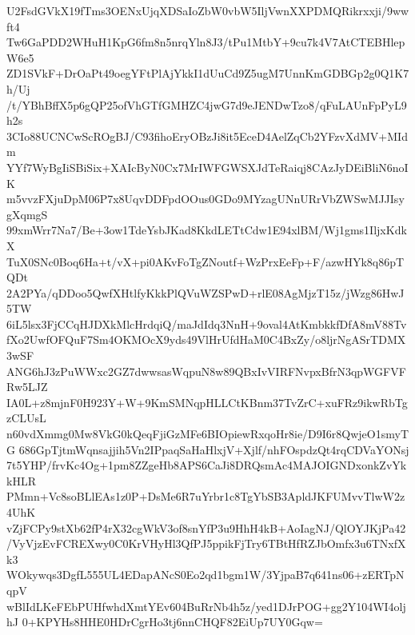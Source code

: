 U2FsdGVkX19fTms3OENxUjqXDSaIoZbW0vbW5IljVwnXXPDMQRikrxxji/9wwft4
Tw6GaPDD2WHuH1KpG6fm8n5nrqYln8J3/tPu1MtbY+9cu7k4V7AtCTEBHlepW6e5
ZD1SVkF+DrOaPt49oegYFtPlAjYkkI1dUuCd9Z5ugM7UnnKmGDBGp2g0Q1K7h/Uj
/t/YBhBffX5p6gQP25ofVhGTfGMHZC4jwG7d9eJENDwTzo8/qFuLAUnFpPyL9h2s
3CIo88UCNCwScROgBJ/C93fihoEryOBzJi8it5EceD4AelZqCb2YFzvXdMV+MIdm
YYf7WyBgIiSBiSix+XAIcByN0Cx7MrIWFGWSXJdTeRaiqj8CAzJyDEiBliN6noIK
m5vvzFXjuDpM06P7x8UqvDDFpdOOus0GDo9MYzagUNnURrVbZWSwMJJIsygXqmgS
99xmWrr7Na7/Be+3ow1TdeYsbJKad8KkdLETtCdw1E94xlBM/Wj1gms1IljxKdkX
TuX0SNc0Boq6Ha+t/vX+pi0AKvFoTgZNoutf+WzPrxEeFp+F/azwHYk8q86pTQDt
2A2PYa/qDDoo5QwfXHtlfyKkkPlQVuWZSPwD+rlE08AgMjzT15z/jWzg86HwJ5TW
6iL5lsx3FjCCqHJDXkMlcHrdqiQ/maJdIdq3NnH+9oval4AtKmbkkfDfA8mV88Tv
fXo2UwfOFQuF7Sm4OKMOcX9yds49VlHrUfdHaM0C4BxZy/o8ljrNgASrTDMX3wSF
ANG6hJ3zPuWWxc2GZ7dwwsasWqpuN8w89QBxIvVIRFNvpxBfrN3qpWGFVFRw5LJZ
IA0L+z8mjnF0H923Y+W+9KmSMNqpHLLCtKBnm37TvZrC+xuFRz9ikwRbTgzCLUsL
n60vdXmmg0Mw8VkG0kQeqFjiGzMFe6BIOpiewRxqoHr8ie/D9I6r8QwjeO1smyTG
686GpTjtmWqnsajjih5Vn2IPpaqSaHaHlxjV+Xjlf/nhFOspdzQt4rqCDVaYONsj
7t5YHP/frvKc4Og+1pm8ZZgeHb8APS6CaJi8DRQsmAc4MAJOIGNDxonkZvYkkHLR
PMmn+Vc8soBLlEAs1z0P+DsMe6R7uYrbr1c8TgYbSB3ApldJKFUMvvTlwW2z4UhK
vZjFCPy9stXb62fP4rX32cgWkV3of8snYfP3u9HhH4kB+AoIagNJ/QlOYJKjPa42
/VyVjzEvFCREXwy0C0KrVHyHl3QfPJ5ppikFjTry6TBtHfRZJbOmfx3u6TNxfXk3
WOkywqs3DgfL555UL4EDapANcS0Eo2qd1bgm1W/3YjpaB7q641ns06+zERTpNqpV
wBlIdLKeFEbPUHfwhdXmtYEv604BuRrNb4h5z/yed1DJrPOG+gg2Y104WI4oljhJ
0+KPYHs8HHE0HDrCgrHo3tj6nnCHQF82EiUp7UY0Gqw=
